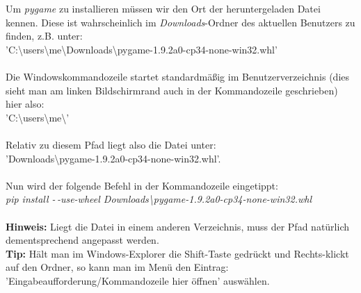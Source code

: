 \documentclass[ngerman,oneside, a4letter]{article}
\begin{document}
\noindent Um \emph{pygame} zu installieren müssen wir den Ort der heruntergeladen Datei kennen. Diese ist wahrscheinlich im \emph{Downloads}-Ordner des aktuellen Benutzers zu finden, z.B. unter:
\\
'C:\textbackslash users\textbackslash me\textbackslash Downloads\textbackslash pygame-1.9.2a0-cp34-none-win32.whl'
\\
\\
Die Windowskommandozeile startet standardmäßig im Benutzerverzeichnis (dies sieht man am linken Bildschirmrand auch in der Kommandozeile geschrieben) hier also:
\\
'C:\textbackslash users\textbackslash me\textbackslash'
\\
\\
Relativ zu diesem Pfad liegt also die Datei unter:
\\'Downloads\textbackslash pygame-1.9.2a0-cp34-none-win32.whl'. 
\\
\\
Nun wird der folgende Befehl in der Kommandozeile eingetippt:
\\
\emph{pip install -\,-use-wheel Downloads\textbackslash pygame-1.9.2a0-cp34-none-win32.whl}
\\
\\
\textbf{Hinweis:} Liegt die Datei in einem anderen Verzeichnis, muss der Pfad natürlich dementsprechend angepasst werden.
\\\textbf{Tip:} Hält man im Windows-Explorer die Shift-Taste gedrückt und Rechts-klickt auf den Ordner, so kann man im Menü den Eintrag: 'Eingabeaufforderung/Kommandozeile hier öffnen' auswählen.

\begin{center}
\end{center}
\end{document}
